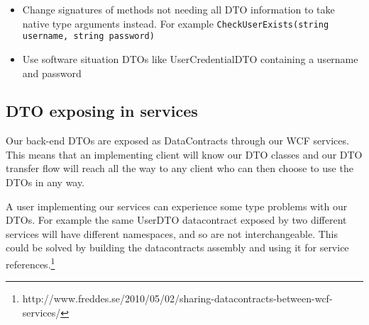 \documentclass[../report.tex]{subfiles}
\begin{document}
\begin{itemize}
\item Change signatures of methods not needing all DTO information to take native type arguments instead. For example \texttt{CheckUserExists(string username, string password)}
\item Use software situation DTOs like UserCredentialDTO containing a username and password
\end{itemize}


\subsection{DTO exposing in services}

Our back-end DTOs are exposed as DataContracts through our WCF services. This means that an implementing client will know our DTO classes and our DTO transfer flow will reach all the way to any client who can then choose to use the DTOs in any way.

A user implementing our services can experience some type problems with our DTOs. For example the same UserDTO datacontract exposed by two different services will have different namespaces, and so are not interchangeable. This could be solved by building the datacontracts assembly and using it for service references.\footnote{http://www.freddes.se/2010/05/02/sharing-datacontracts-between-wcf-services/} 
\end{document}
